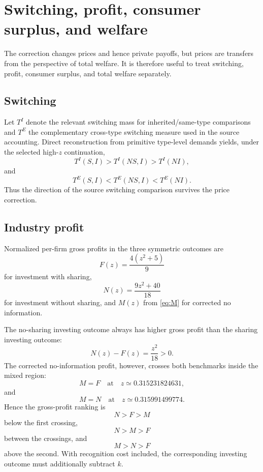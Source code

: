 \section{Switching, profit, consumer surplus, and welfare}\label{sec:welfare}

The correction changes prices and hence private payoffs, but prices are transfers from the perspective of total welfare.  It is therefore useful to treat switching, profit, consumer surplus, and total welfare separately.

\subsection{Switching}

Let \(T^I\) denote the relevant switching mass for inherited/same-type comparisons and \(T^E\) the complementary cross-type switching measure used in the source accounting.  Direct reconstruction from primitive type-level demands yields, under the selected high-\(z\) continuation,
\[
T^I(S,I)>T^I(NS,I)>T^I(NI),
\]
and
\[
T^E(S,I)<T^E(NS,I)<T^E(NI).
\]
Thus the direction of the source switching comparison survives the price correction.

\subsection{Industry profit}

Normalized per-firm gross profits in the three symmetric outcomes are
\begin{equation}
F(z)=\frac{4(z^2+5)}9
\label{eq:F}
\end{equation}
for investment with sharing,
\begin{equation}
N(z)=\frac{9z^2+40}{18}
\label{eq:N}
\end{equation}
for investment without sharing, and \(M(z)\) from \eqref{eq:M} for corrected no information.

The no-sharing investing outcome always has higher gross profit than the sharing investing outcome:
\[
N(z)-F(z)=\frac{z^2}{18}>0.
\]
The corrected no-information profit, however, crosses both benchmarks inside the mixed region:
\[
M=F
\quad\text{at}\quad
z\simeq0.315231824631,
\]
and
\[
M=N
\quad\text{at}\quad
z\simeq0.315991499774.
\]
Hence the gross-profit ranking is
\[
N>F>M
\]
below the first crossing,
\[
N>M>F
\]
between the crossings, and
\[
M>N>F
\]
above the second.  With recognition cost included, the corresponding investing outcome must additionally subtract \(k\).

